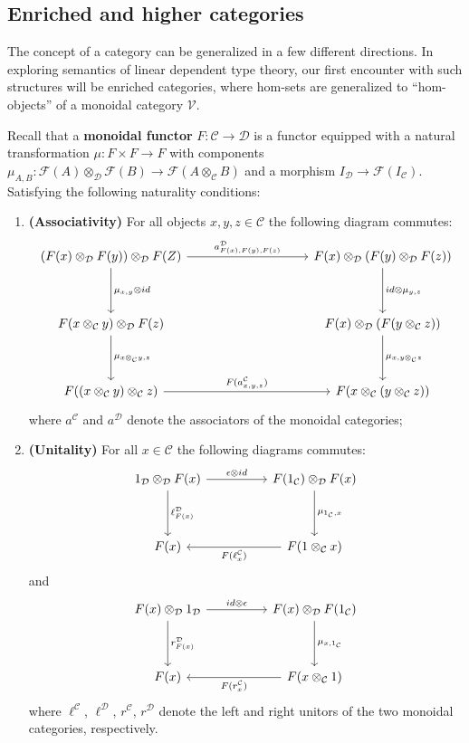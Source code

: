 \subsection{Enriched and higher categories}
The concept of a category can be generalized in a few different directions. In exploring semantics of linear dependent type theory, our first encounter with such structures will be  enriched categories, where hom-sets are generalized to ``hom-objects'' of a monoidal category $\mathcal{V}$.
\begin{defn}Recall that a \textbf{monoidal functor} $F : \mathcal{C} \to \mathcal{D}$ is a functor equipped with a natural transformation $\mu : F \times F \to F$ with components $\mu_{A,B} : \mathcal{F}(A) \otimes_{\mathcal{D}} \mathcal{F}(B) \to \mathcal{F}(A \otimes_{\mathcal{C}} B)$ and a morphism $I_{\mathcal{D}} \to \mathcal{F}(I_{\mathcal{C}})$. Satisfying the following naturality conditions:

  
\begin{enumerate}
\item \textbf{(Associativity)} For all objects $x,y,z \in \mathcal{C}$ the following diagram commutes:
  \[
    \ti
    (F(x) \otimes_{\mathcal{D}} F(y)) \otimes_{\mathcal{D}} F(Z)
    \ar[rr,"{a^{\mathcal{D}}_{F(x),F(y),F(z)}}"]
    \ar[d, "{\mu_{x,y} \otimes id}"] & &
    F(x) \otimes_{\mathcal{D}}( F(y)\otimes_{\mathcal{D}} F(z) )
    \ar[d, "{id\otimes \mu_{y,z}}"]\\
    F(x \otimes_{\mathcal{C}} y) \otimes_{\mathcal{D}} F(z)
    \ar[d, "{\mu_{x \otimes_{\mathcal{C}} y , z} }"]
     &&
     F(x) \otimes_{\mathcal{D}} ( F(y \otimes_{\mathcal{C}} z) )
     \ar[d, "\mu_{ x, y \otimes_{\mathcal{C}} z  }"]
     \\
     F( ( x \otimes_{\mathcal{C}} y ) \otimes_{\mathcal{C}} z  )
     \ar[rr, "F(a^{\mathcal{C}}_{x,y,z})"]&&
    F( x \otimes_{\mathcal{C}} ( y \otimes_{\mathcal{C}} z ) )
    \kz
\]
where $a^{\mathcal{C}}$ and $a^{\mathcal{D}}$ denote the associators of the monoidal categories;
\item \textbf{(Unitality)} For all $x \in \mathcal{C}$ the following diagrams commutes:
  \[
    \ti
    1_{\mathcal{D}} \otimes_{\mathcal{D}} F(x)
    \ar[r, "\epsilon \otimes id"]
    \ar[d, "\ell^{\mathcal{D}}_{F(x)}"]
      &
      F(1_{\mathcal{C}}) \otimes_{\mathcal{D}} F(x)
      \ar[d, "\mu_{1_{\mathcal{C}}, x }"]
      \\
      F(x) &
      \ar[l, "F(\ell^{\mathcal{C}}_x)"]
      F( 1 \otimes_{\mathcal{C}} x)
      \kz
\]
and
  \[
    \ti
     F(x) \otimes_{\mathcal{D}} 1_{\mathcal{D}} 
    \ar[r, "id \otimes \epsilon"]
    \ar[d, "r^{\mathcal{D}}_{F(x)}"]
      &
      F(x) \otimes_{\mathcal{D}}F(1_{\mathcal{C}}) 
      \ar[d, "\mu_{x, 1_{\mathcal{C}}}"]
      \\
      F(x) &
      \ar[l, "F(r^{\mathcal{C}}_x)"]
      F( x \otimes_{\mathcal{C}} 1)
      \kz
\]
where $\ell^{\mathcal{C}}$, $\ell^{\mathcal{D}}$, $r^{\mathcal{C}}$, $r^{\mathcal{D}}$ denote the left and right unitors of the two monoidal categories, respectively.
\end{enumerate}
\end{defn}
